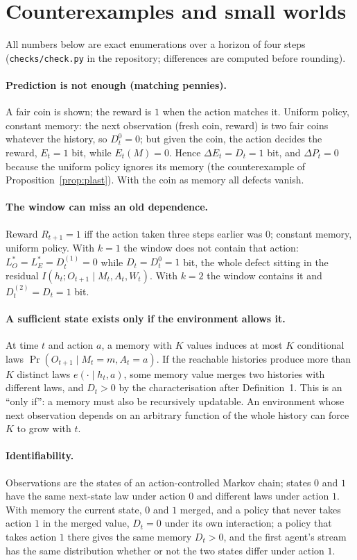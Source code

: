 \documentclass[11pt]{article}
\theoremstyle{plain}
\theoremstyle{definition}
\theoremstyle{remark}
\newcommand{\dE}{\Delta E}
\newcommand{\dP}{\Delta P}
\begin{document}
\section{Counterexamples and small worlds}\label{app:counter}
All numbers below are exact enumerations over a horizon of four steps (\texttt{checks/check.py} in the repository; differences are computed before rounding).

\paragraph{Prediction is not enough (matching pennies).} A fair coin is shown; the reward is $1$ when the action matches it. Uniform policy, constant memory: the next observation (fresh coin, reward) is two fair coins whatever the history, so $D^0_t = 0$; but given the coin, the action decides the reward, $E_t = 1$ bit, while $E_t(M) = 0$. Hence $\dE_t = D_t = 1$ bit, and $\dP_t = 0$ because the uniform policy ignores its memory (the counterexample of Proposition~\ref{prop:plast}). With the coin as memory all defects vanish.

\paragraph{The window can miss an old dependence.} Reward $R_{t+1} = 1$ iff the action taken three steps earlier was $0$; constant memory, uniform policy. With $k = 1$ the window does not contain that action: $L^*_O = L^*_E = D^{(1)}_t = 0$ while $D_t = D^0_t = 1$ bit, the whole defect sitting in the residual $I(h_t; O_{t+1} \mid M_t, A_t, W_t)$. With $k = 2$ the window contains it and $D^{(2)}_t = D_t = 1$ bit.

\paragraph{A sufficient state exists only if the environment allows it.} At time $t$ and action $a$, a memory with $K$ values induces at most $K$ conditional laws $\Pr(O_{t+1} \mid M_t = m, A_t = a)$. If the reachable histories produce more than $K$ distinct laws $e(\cdot \mid h_t, a)$, some memory value merges two histories with different laws, and $D_t > 0$ by the characterisation after Definition~1. This is an ``only if'': a memory must also be recursively updatable. An environment whose next observation depends on an arbitrary function of the whole history can force $K$ to grow with $t$.

\paragraph{Identifiability.} Observations are the states of an action-controlled Markov chain; states $0$ and $1$ have the same next-state law under action $0$ and different laws under action $1$. With memory the current state, $0$ and $1$ merged, and a policy that never takes action $1$ in the merged value, $D_t = 0$ under its own interaction; a policy that takes action $1$ there gives the same memory $D_t > 0$, and the first agent's stream has the same distribution whether or not the two states differ under action $1$.
\end{document}
